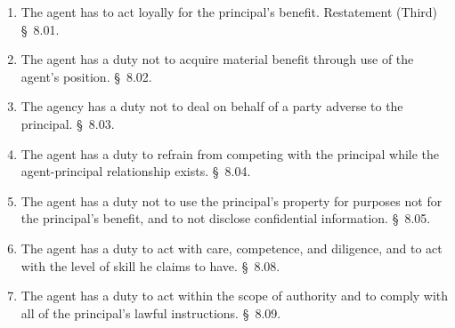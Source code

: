 \begin{enumerate}
    \item The agent has to act loyally for the principal's benefit. 
    Restatement (Third) \S\ 8.01.
    \item The agent has a duty not to acquire material benefit through use of 
    the agent's position. \S\ 8.02.
    \item The agency has a duty not to deal on behalf of a party adverse to 
    the principal. \S\ 8.03.
    \item The agent has a duty to refrain from competing with the principal 
    while the agent-principal relationship exists. \S\ 8.04.
    \item The agent has a duty not to use the principal's property for 
    purposes not for the principal's benefit, and to not disclose confidential 
    information. \S\ 8.05.
    \item The agent has a duty to act with care, competence, and diligence, 
    and to act with the level of skill he claims to have. \S\ 8.08.
    \item The agent has a duty to act within the scope of authority and to 
    comply with all of the principal's lawful instructions. \S\ 8.09.
\end{enumerate}
